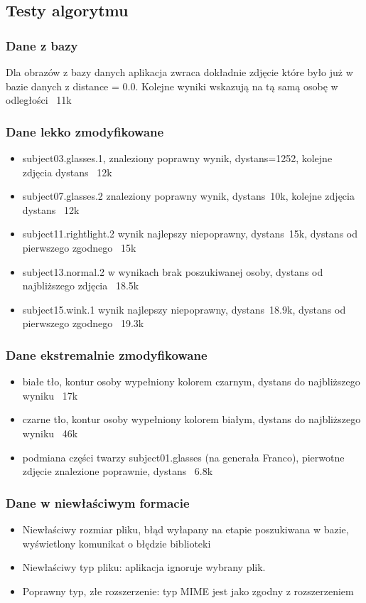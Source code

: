 \documentclass[]{article}
\begin{document}
\subsection{Testy algorytmu}

\subsubsection{Dane z bazy}
Dla obrazów z bazy danych aplikacja zwraca dokładnie zdjęcie które było już w bazie danych z distance = 0.0. Kolejne wyniki wskazują na tą samą osobę w odległości ~11k
\subsubsection{Dane lekko zmodyfikowane}
\begin{itemize}
	\item subject03.glasses.1, znaleziony poprawny wynik, dystans=1252, kolejne zdjęcia dystans ~12k
	\item subject07.glasses.2 znaleziony poprawny wynik, dystans~10k, kolejne zdjęcia dystans ~12k
	\item subject11.rightlight.2 wynik najlepszy niepoprawny, dystans~15k, dystans od pierwszego zgodnego ~15k
	\item subject13.normal.2 w wynikach brak poszukiwanej osoby, dystans od najbliższego zdjęcia ~18.5k
	\item subject15.wink.1 wynik najlepszy niepoprawny, dystans~18.9k, dystans od pierwszego zgodnego ~19.3k
\end{itemize}
\subsubsection{Dane ekstremalnie zmodyfikowane}
\begin{itemize}
	\item białe tło, kontur osoby wypełniony kolorem czarnym, dystans do najbliższego wyniku ~17k 
	\item czarne tło, kontur osoby wypełniony kolorem białym, dystans do najbliższego wyniku ~46k
	\item podmiana części twarzy subject01.glasses (na generała Franco), pierwotne zdjęcie znalezione poprawnie, dystans ~6.8k 
\end{itemize}
\subsubsection{Dane w niewłaściwym formacie}
\begin{itemize}
	\item Niewłaściwy rozmiar pliku, błąd wyłapany na etapie poszukiwana w bazie, wyświetlony komunikat o błędzie biblioteki
	\item Niewłaściwy typ pliku: aplikacja ignoruje wybrany plik.
	\item Poprawny typ, złe rozszerzenie: typ MIME jest jako zgodny z rozszerzeniem
\end{itemize}
\end{document}
